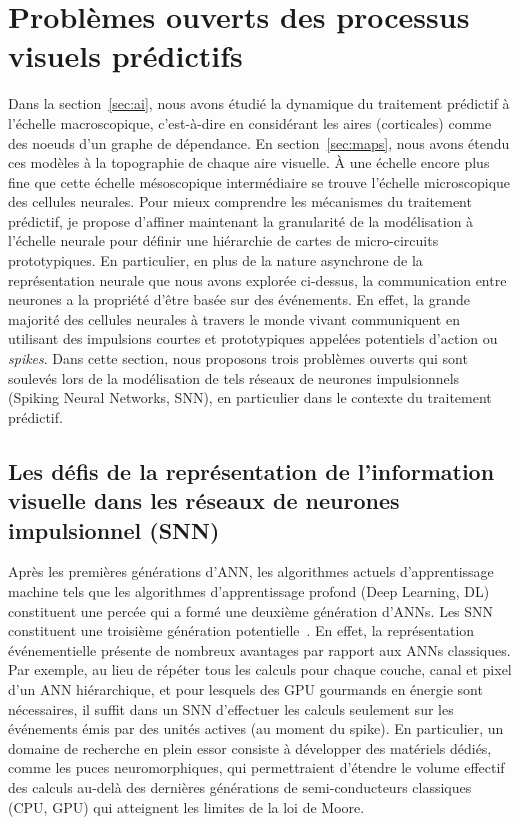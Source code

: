 \documentclass[11pt,french,a4paper,oneside]{article}%
\begin{document}
\section{Problèmes ouverts des processus visuels prédictifs}
\label{sec:spikes}
Dans la section~\ref{sec:ai}, nous avons étudié la dynamique du traitement prédictif à
l'échelle macroscopique, c'est-à-dire en considérant les aires
(corticales) comme des noeuds d'un graphe de dépendance. En section~\ref{sec:maps},
nous avons étendu ces modèles à la topographie de chaque aire visuelle. À une échelle
encore plus fine que cette échelle mésoscopique intermédiaire se trouve
l'échelle microscopique des cellules neurales. Pour mieux
comprendre les mécanismes du traitement prédictif, je propose d'affiner
maintenant la granularité de la modélisation à l'échelle neurale
pour définir une hiérarchie de cartes de micro-circuits prototypiques. En
particulier, en plus de la nature asynchrone de la représentation
neurale que nous avons explorée ci-dessus, la communication entre
neurones a la propriété d'être basée sur des événements. En effet, la
grande majorité des cellules neurales à travers le monde vivant
communiquent en utilisant des impulsions courtes et prototypiques
appelées potentiels d'action ou \emph{spikes}. Dans cette section, nous
proposons trois problèmes ouverts qui sont soulevés lors de la
modélisation de tels réseaux de neurones impulsionnels (Spiking Neural Networks, SNN), en particulier dans le contexte du traitement prédictif.

\subsection{Les défis de la représentation de l'information visuelle
dans les réseaux de neurones impulsionnel
(SNN)}
Après les premières générations d'ANN, les algorithmes actuels
d'apprentissage machine tels que les algorithmes d'apprentissage profond
(Deep Learning, DL) constituent une percée qui a formé une deuxième génération d'ANNs.
Les SNN constituent une troisième génération potentielle~\citep{Ghosh09}. En effet, la représentation événementielle présente de
nombreux avantages par rapport aux ANNs classiques. Par exemple, au lieu de
répéter tous les calculs ­pour chaque couche, canal et pixel d'un ANN
hiérarchique, et pour lesquels des GPU gourmands en énergie sont
nécessaires, il suffit dans un SNN d'effectuer les calculs seulement sur les événements
émis par des unités actives (au moment du spike). En particulier, un domaine de
recherche en plein essor consiste à développer des matériels dédiés,
comme les puces neuromorphiques, qui permettraient d'étendre le volume
effectif des calculs au-delà des dernières générations de
semi-conducteurs classiques (CPU, GPU) qui atteignent les limites de la
loi de Moore.
\end{document}
